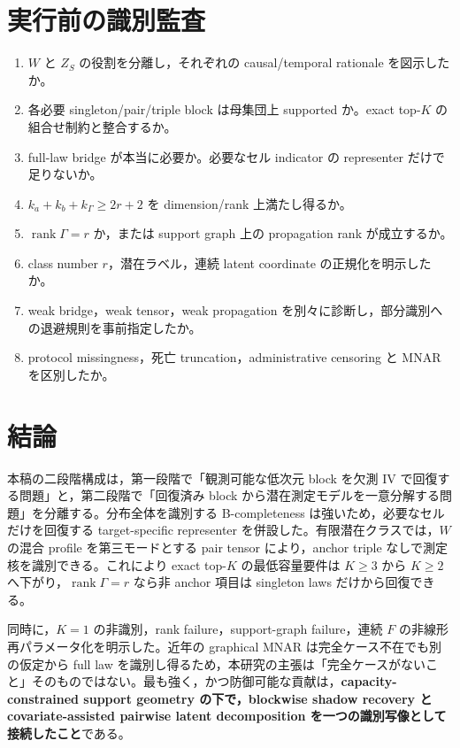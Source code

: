\documentclass[11pt,a4paper]{ltjsarticle}
\theoremstyle{remark}\newtheorem{remark}{注意}[section]
\newcommand{\rank}{\operatorname{rank}}
\begin{document}
\section{実行前の識別監査}
\begin{tcolorbox}[colback=soft,colframe=risk,boxrule=.8pt,arc=2mm,title=理論をデータへ持ち込む前のチェック]
\begin{enumerate}
\item $W$ と $Z_S$ の役割を分離し，それぞれの causal/temporal rationale を図示したか。
\item 各必要 singleton/pair/triple block は母集団上 supported か。exact top-$K$ の組合せ制約と整合するか。
\item full-law bridge が本当に必要か。必要なセル indicator の representer だけで足りないか。
\item $k_a+k_b+k_\Gamma\ge2r+2$ を dimension/rank 上満たし得るか。
\item $\rank\Gamma=r$ か，または support graph 上の propagation rank が成立するか。
\item class number $r$，潜在ラベル，連続 latent coordinate の正規化を明示したか。
\item weak bridge，weak tensor，weak propagation を別々に診断し，部分識別への退避規則を事前指定したか。
\item protocol missingness，死亡 truncation，administrative censoring と MNAR を区別したか。
\end{enumerate}
\end{tcolorbox}

\section{結論}

本稿の二段階構成は，第一段階で「観測可能な低次元 block を欠測 IV で回復する問題」と，第二段階で「回復済み block から潜在測定モデルを一意分解する問題」を分離する。分布全体を識別する B-completeness は強いため，必要なセルだけを回復する target-specific representer を併設した。有限潜在クラスでは，$W$ の混合 profile を第三モードとする pair tensor により，anchor triple なしで測定核を識別できる。これにより exact top-$K$ の最低容量要件は $K\ge3$ から $K\ge2$ へ下がり，$\rank\Gamma=r$ なら非 anchor 項目は singleton laws だけから回復できる。

同時に，$K=1$ の非識別，rank failure，support-graph failure，連続 $F$ の非線形再パラメータ化を明示した。近年の graphical MNAR は完全ケース不在でも別の仮定から full law を識別し得るため，本研究の主張は「完全ケースがないこと」そのものではない。最も強く，かつ防御可能な貢献は，\textbf{capacity-constrained support geometry の下で，blockwise shadow recovery と covariate-assisted pairwise latent decomposition を一つの識別写像として接続したこと}である。
\end{document}

